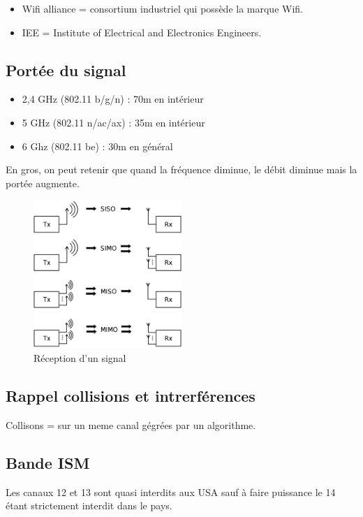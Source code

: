 \documentclass[12pt, a4paper]{article}
\begin{document}
\begin{itemize}
    \item Wifi alliance = consortium industriel qui possède la marque Wifi.
    \item IEE = Institute of Electrical and Electronics Engineers.
\end{itemize}
\newpage
\subsection{Portée du signal}

\begin{itemize}
    \item 2,4 GHz (802.11 b/g/n) : 70m en intérieur
    \item 5 GHz (802.11 n/ac/ax) : 35m en intérieur 
    \item 6 Ghz (802.11 be) : 30m en général \\
\end{itemize}

En gros, on peut retenir que quand la fréquence diminue, le débit diminue mais
la portée augmente. 

\begin{figure}[H]
    \centering
    \includegraphics[width=0.5\textwidth]{../img/rx.png}
    \caption{Réception d'un signal}
    \label{fig:schema}
\end{figure}

\subsection{Rappel collisions et intrerférences}
Collisons = sur un meme canal gégrées par un algorithme. 

\subsection{Bande ISM}
Les canaux 12 et 13 sont quasi interdits aux USA sauf à faire puissance le 14 étant
strictement interdit dans le pays.
\end{document}
